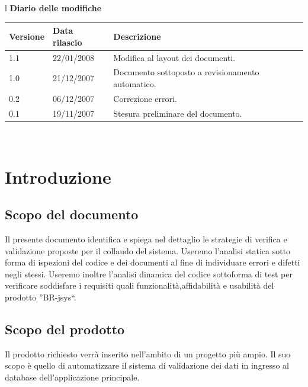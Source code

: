 \documentclass[11pt,titlepage,a4paper]{report}
\begin{document}
\begin{center}
\begin{table}[hbtp]
\large{
\begin{tabular}{l}
\Large{\textbf{\textsf{Diario delle modifiche}}} \\
\begin{tabular}{||p{2cm}||p{3.5cm}||p{6cm}||}
\hline
\textbf{Versione} & \textbf{Data rilascio} & \textbf{Descrizione} \\ \hline
1.1 & 22/01/2008 & Modifica al layout dei documenti.\\ \hline
1.0 & 21/12/2007 & Documento sottoposto a revisionamento automatico.\\ \hline
0.2 & 06/12/2007 & Correzione errori. \\ \hline
0.1 & 19/11/2007 & Stesura preliminare del documento. \\ \hline
\end{tabular} \\
\end{tabular}

}
\end{table}
\end{center}

\tableofcontents	%

\chapter{Introduzione}
\section{Scopo del documento}
Il presente documento identifica e spiega nel dettaglio le strategie di verifica e validazione proposte per il collaudo del sistema. Useremo l'analisi statica sotto forma di ispezioni del codice e dei documenti al fine di individuare errori e difetti negli stessi. Useremo inoltre l'analisi dinamica del codice sottoforma di test per verificare soddisfare i requisiti quali funzionalit\`a,affidabilit\`a e usabilit\`a del prodotto ''BR-jsys``.

\section{Scopo del prodotto}
Il prodotto richiesto verr\`a inserito nell'ambito di un progetto pi\`u ampio. Il suo scopo \`e quello di automatizzare il sistema di validazione dei dati in ingresso al database dell'applicazione principale.
\end{document}
